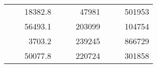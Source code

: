 \begin{table}[H]
\begin{tabular}{|ccrccrccc}
\rowcolor[HTML]{DDFDFF} 
\multicolumn{1}{|c|}{\cellcolor[HTML]{FFFFC7}}                                & \multicolumn{1}{c|}{\cellcolor[HTML]{DDFDFF}}                      & \multicolumn{1}{r|}{\cellcolor[HTML]{DAE8FC}18382.8}   & \multicolumn{1}{c|}{\cellcolor[HTML]{FFFFC7}}                                & \multicolumn{1}{c|}{\cellcolor[HTML]{DDFDFF}}                       & \multicolumn{1}{r|}{\cellcolor[HTML]{DDFDFF}47981}     & \multicolumn{1}{c|}{\cellcolor[HTML]{FFFFC7}}                                & \multicolumn{1}{c|}{\cellcolor[HTML]{DDFDFF}}                      & \multicolumn{1}{r|}{\cellcolor[HTML]{DDFDFF}501953}    \\ \cline{3-3} \cline{6-6} \cline{9-9} 
\multicolumn{1}{|c|}{\cellcolor[HTML]{FFFFC7}}                                & \multicolumn{1}{c|}{\cellcolor[HTML]{DDFDFF}}                      & \multicolumn{1}{r|}{\cellcolor[HTML]{DDFDFF}56493.1}   & \multicolumn{1}{c|}{\cellcolor[HTML]{FFFFC7}}                                & \multicolumn{1}{c|}{\cellcolor[HTML]{DDFDFF}}                       & \multicolumn{1}{r|}{\cellcolor[HTML]{DAE8FC}203099}    & \multicolumn{1}{c|}{\cellcolor[HTML]{FFFFC7}}                                & \multicolumn{1}{c|}{\cellcolor[HTML]{DDFDFF}}                      & \multicolumn{1}{r|}{\cellcolor[HTML]{DAE8FC}104754}    \\ \cline{3-3} \cline{6-6} \cline{9-9} 
\rowcolor[HTML]{DDFDFF} 
\multicolumn{1}{|c|}{\cellcolor[HTML]{FFFFC7}}                                & \multicolumn{1}{c|}{\cellcolor[HTML]{DDFDFF}}                      & \multicolumn{1}{r|}{\cellcolor[HTML]{DAE8FC}3703.2}    & \multicolumn{1}{c|}{\cellcolor[HTML]{FFFFC7}}                                & \multicolumn{1}{c|}{\cellcolor[HTML]{DDFDFF}}                       & \multicolumn{1}{r|}{\cellcolor[HTML]{DDFDFF}239245}    & \multicolumn{1}{c|}{\cellcolor[HTML]{FFFFC7}}                                & \multicolumn{1}{c|}{\cellcolor[HTML]{DDFDFF}}                      & \multicolumn{1}{r|}{\cellcolor[HTML]{DDFDFF}866729}    \\ \cline{3-3} \cline{6-6} \cline{9-9} 
\multicolumn{1}{|c|}{\cellcolor[HTML]{FFFFC7}}                                & \multicolumn{1}{c|}{\cellcolor[HTML]{DDFDFF}}                      & \multicolumn{1}{r|}{\cellcolor[HTML]{DDFDFF}50077.8}   & \multicolumn{1}{c|}{\cellcolor[HTML]{FFFFC7}}                                & \multicolumn{1}{c|}{\cellcolor[HTML]{DDFDFF}}                       & \multicolumn{1}{r|}{\cellcolor[HTML]{DAE8FC}220724}    & \multicolumn{1}{c|}{\cellcolor[HTML]{FFFFC7}}                                & \multicolumn{1}{c|}{\cellcolor[HTML]{DDFDFF}}                      & \multicolumn{1}{r|}{\cellcolor[HTML]{DAE8FC}301858}    \\ \cline{3-3} \cline{6-6} \cline{9-9} 

\end{tabular}
\end{table}
